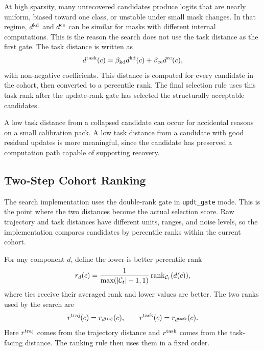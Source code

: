 At high sparsity, many unrecovered candidates produce logits that are nearly uniform, biased toward one class, or unstable under small mask changes. In that regime, $d^{\mathrm{kd}}$ and $d^{\mathrm{ce}}$ can be similar for masks with different internal computations. This is the reason the search does not use the task distance as the first gate. The task distance is written as
\begin{equation}
d^{\mathrm{task}}(c)
=
\beta_{\mathrm{kd}}d^{\mathrm{kd}}(c)
+
\beta_{\mathrm{ce}}d^{\mathrm{ce}}(c),
\label{eq:task_component}
\end{equation}
with non-negative coefficients. This distance is computed for every candidate in the cohort, then converted to a percentile rank. The final selection rule uses this task rank after the update-rank gate has selected the structurally acceptable candidates.

A low task distance from a collapsed candidate can occur for accidental reasons on a small calibration pack. A low task distance from a candidate with good residual updates is more meaningful, since the candidate has preserved a computation path capable of supporting recovery.

\subsection{Two-Step Cohort Ranking}
\label{metric:cohort}

The search implementation uses the double-rank gate in \texttt{updt\_gate} mode. This is the point where the two distances become the actual selection score. Raw trajectory and task distances have different units, ranges, and noise levels, so the implementation compares candidates by percentile ranks within the current cohort.

For any component $d$, define the lower-is-better percentile rank
\begin{equation}
r_d(c)
=
\frac{1}{\max(|\mathcal{C}_t|-1,1)}
\operatorname{rank}_{\mathcal{C}_t}(d(c)),
\label{eq:cohort_rank}
\end{equation}
where ties receive their averaged rank and lower values are better. The two ranks used by the search are
\[
r^{\mathrm{traj}}(c)=r_{d^{\mathrm{traj}}}(c),
\qquad
r^{\mathrm{task}}(c)=r_{d^{\mathrm{task}}}(c).
\]
Here $r^{\mathrm{traj}}$ comes from the trajectory distance and $r^{\mathrm{task}}$ comes from the task-facing distance. The ranking rule then uses them in a fixed order.

